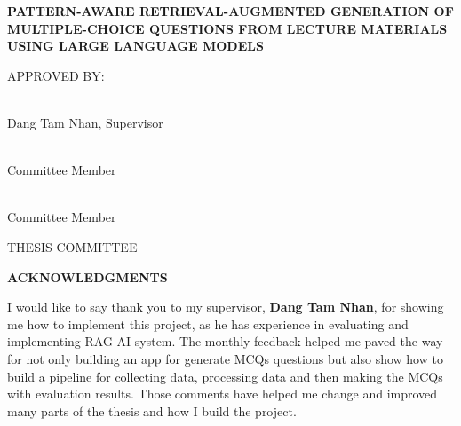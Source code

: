 \documentclass[12pt,a4paper]{article}
\begin{document}

\setcounter{page}{1}


\newpage
\thispagestyle{empty}
\begin{center}
  \singlespacing

  {\bfseries
    PATTERN-AWARE RETRIEVAL-AUGMENTED GENERATION OF\\[6pt]
    MULTIPLE-CHOICE QUESTIONS FROM LECTURE MATERIALS\\[6pt]
    USING LARGE LANGUAGE MODELS\par}

  \vspace{2.2cm}

  APPROVED BY:

  \vspace{1.5cm}

  \makebox[4.2in]{\hrulefill}\\{}
  Dang Tam Nhan, Supervisor

  \vspace{1.3cm}

  \makebox[4.2in]{\hrulefill}\\{}
  Committee Member

  \vspace{1.3cm}

  \makebox[4.2in]{\hrulefill}\\{}
  Committee Member

  \vspace{1.8cm}

  THESIS COMMITTEE
\end{center}


\newpage
\thispagestyle{empty}
\begin{center}
  \textbf{ACKNOWLEDGMENTS}
\end{center}

\vspace{1cm}

I would like to say thank you to my supervisor, \textbf{Dang Tam Nhan}, for showing me how to implement this project, as he has experience in evaluating and implementing RAG AI system. The monthly feedback helped me paved the way for not only building an app for generate MCQs questions but also show how to build a pipeline for collecting data, processing data and then making the MCQs with evaluation results. Those comments have helped me change and improved many parts of the thesis and how I build the project.
\end{document}
